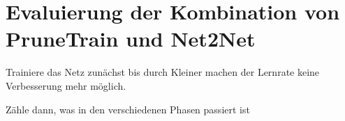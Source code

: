 

\chapter{Evaluierung der Kombination von PruneTrain und Net2Net }\label{sec:ptpnet2net}

Trainiere das Netz zunächst bis durch Kleiner machen der Lernrate keine Verbesserung mehr möglich.

Zähle dann, was in den verschiedenen Phasen passiert ist






\begin{comment}
Adaptive Kombination of prune and net2net

AKoPaN

Für die Kombination betrachten wir zunächst den Ausgang eines PruneTrain-Durchlaufs über 180 Epochen mit verschieden breiten Netzen:

4,8,16


8,16,32


16,32,64


und verschieden tiefen Netzen:

[3,3,3]


[4,4,4]




Gestartet wird wie bei Morphnet einmal mit 


4,8,16 und mit 


8,16,32
jeweils mit 3 Blöcken pro Phase
anlaog zu Kapitel 4.


um das Grösserwerden des Netzes nicht ausarten zu lassen sollte es nicht größer werden als 
das [5,5,5] er Netz mit 16,32,64 als maximalen Größe vorgegeben.




Drei Probleme können beim Training des Ntzes auftauchen:
\begin{itemize}
 \item Underfitting
 \item Overfitting
 \item Saturation
 \item Rumspringen ohne eine Tendenz zur Verbesserung
\end{itemize}

Underfitting erkennen wir durch einen immer noch recht hohen Trainingsfehler und relativ wenig Pruning.


Sowohl bei Hinzufügen von neuen Blöcken als auch beim Breiter machen des Netzes kann Overfitting passieren. Kommt es zu Overfitting ist es möglich, den Lasso-Ratio koeffizient weiter zu erhöhen, oder den Grenzwert zum Beschneiden des Netzes zu Erhöhen. Das heisst es ist nötig, Overfitting zu erkennen. Dies wird hier durch Abstand von Trainings und Validierungsfehler. Wird der Abstand hier grösser bei einer Zunnahme des Validierungsfehlers oder  ist die Testaccuracy bei 100 \% angekommen, wird Overfitting diagnostiziert.


Saturation
Bilde aus den letzten 10 Validierungsaccuracy jeweils ein exponentiel geglättetes Mittel gewichtetes Mittel. Zeigt dieses Mittel keine Verbesserung innerhalb der nächsten 10 Epochen -> early stop und je nach vorliegen von Under oder Overfitting weiterverfahren.

\end{comment}
